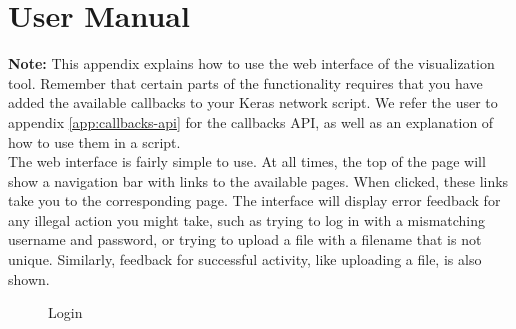\chapter{User Manual} \label{app:user-manual}


\textbf{Note:} This appendix explains how to use the web interface of the visualization tool. Remember that certain parts of the functionality requires that you have added the available callbacks to your Keras network script. We refer the user to appendix \ref{app:callbacks-api} for the callbacks API, as well as an explanation of how to use them in a script. \\

\noindent The web interface is fairly simple to use. At all times, the top of the page will show a navigation bar with links to the available pages. When clicked, these links take you to the corresponding page. The interface will display error feedback for any illegal action you might take, such as trying to log in with a mismatching username and password, or trying to upload a file with a filename that is not unique. Similarly, feedback for successful activity, like uploading a file, is also shown. \\


\begin{figure}[h!]
    \centering
        \caption{Login}
        \label{login}
\end{figure}


